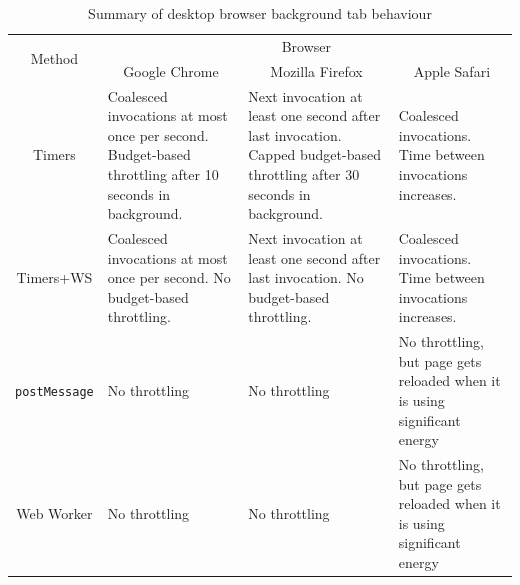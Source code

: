 \documentclass[article,type=bsc,colorback,accentcolor=tud9c]{tudthesis}
\begin{document}
  \begin{table}
    \centering
    \begin{tabular}{ c | p{} | p{} | p{} }
      \multirow{2}{*}{Method} & \multicolumn{3}{c}{Browser} \\
      \cline{2-4}
                              & \multicolumn{1}{|c|}{Google Chrome} & \multicolumn{1}{|c|}{Mozilla Firefox} & \multicolumn{1}{|c|}{Apple Safari} \\
      \hline
      Timers & Coalesced invocations at most once per second.
               Budget-based throttling after 10 seconds in background.
                              & Next invocation at least one second after last invocation.
                                Capped budget-based throttling after 30 seconds in background.
                              & Coalesced invocations. Time between invocations increases. \\
      \hline
      Timers+WS
                              & Coalesced invocations at most once per second. No budget-based throttling.
                              & Next invocation at least one second after last invocation. No budget-based throttling.
                              & Coalesced invocations. Time between invocations increases. \\
      \hline
      \texttt{postMessage}    & No throttling
                              & No throttling
                              & No throttling, but page gets reloaded when it is using significant energy \\
      \hline
      Web Worker              & No throttling
                              & No throttling
                              & No throttling, but page gets reloaded when it is using significant energy
    \end{tabular}
    \caption{Summary of desktop browser background tab behaviour}
    \label{tab:desktop-browser-background}
  \end{table}
\end{document}
